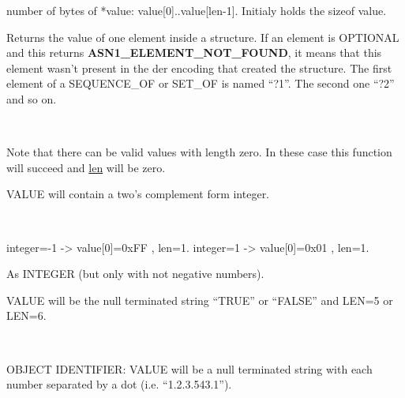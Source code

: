 \documentclass[]{article}
\let\realtextbf=\textbf
\renewcommand{\textbf}[1]{\textcolor{boldcolor}{\realtextbf{#1}}}
\renewcommand{\emph}[1]{\underline{#1}}
\begin{document}
\begin{description}
\itemsep1pt\parskip0pt
\item[int * len]
number of bytes of *value: value{[}0{]}..value{[}len-1{]}. Initialy
holds the sizeof value.
\end{description}


Returns the value of one element inside a structure. If an element is
OPTIONAL and this returns \textbf{ASN1\_ELEMENT\_NOT\_FOUND}, it means
that this element wasn't present in the der encoding that created the
structure. The first element of a SEQUENCE\_OF or SET\_OF is named
``?1''. The second one ``?2'' and so on.

~

Note that there can be valid values with length zero. In these case this
function will succeed and \emph{len} will be zero.


VALUE will contain a two's complement form integer.

~

integer=-1 -\textgreater{} value{[}0{]}=0xFF , len=1. integer=1
-\textgreater{} value{[}0{]}=0x01 , len=1.


As INTEGER (but only with not negative numbers).


VALUE will be the null terminated string ``TRUE'' or ``FALSE'' and LEN=5
or LEN=6.

~

OBJECT IDENTIFIER: VALUE will be a null terminated string with each
number separated by a dot (i.e. ``1.2.3.543.1'').
\end{document}
